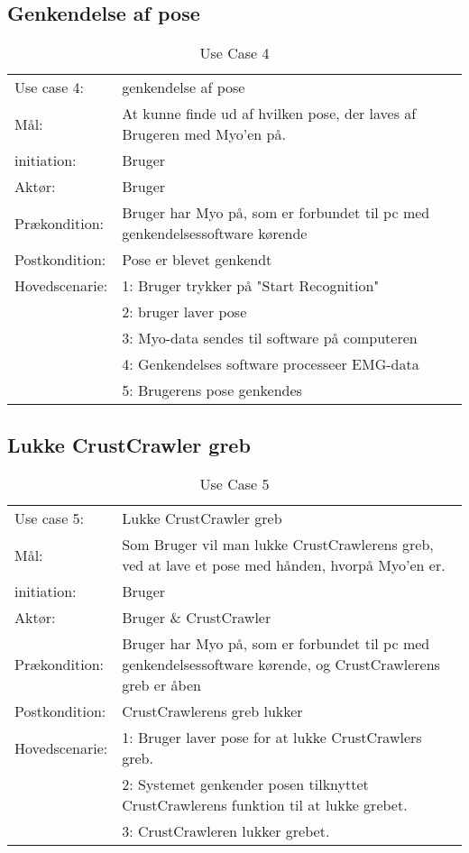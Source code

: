 \subsection{Genkendelse af pose}
\begin{center}
	\begin{table}[htbp]
		\begin{tabular}{lp{274pt}}
			\rowcolor{grey} Use case 4:		& genkendelse af pose\\
			Mål: & At kunne finde ud af hvilken pose, der laves af Brugeren med Myo'en på. \\
			initiation:	& Bruger \\
			Aktør: & Bruger\\
			Prækondition: & Bruger har Myo på, som er forbundet til pc med genkendelsessoftware kørende \\
			Postkondition: & Pose er blevet genkendt \\
			Hovedscenarie: & 1: Bruger trykker på "Start Recognition"\\
			& 2: bruger laver pose \\
			& 3: Myo-data sendes til software på computeren\\
			& 4: Genkendelses software processeer EMG-data\\
			& 5: Brugerens pose genkendes\\
		\end{tabular}
		\caption{Use Case 4}
	\end{table}
\end{center}

\subsection{Lukke CrustCrawler greb}
\begin{center}
	\begin{table}[htbp]
		\begin{tabular}{lp{274pt}}
			\rowcolor{grey} Use case 5:		& Lukke CrustCrawler greb \\
			Mål: & Som Bruger vil man lukke CrustCrawlerens greb, ved at lave et pose med hånden, hvorpå Myo'en er. \\
			initiation:	& Bruger\\
			Aktør: & Bruger \& CrustCrawler\\
			Prækondition: & Bruger har Myo på, som er forbundet til pc med genkendelsessoftware kørende, og CrustCrawlerens greb er åben \\
			Postkondition: & CrustCrawlerens greb lukker \\
			Hovedscenarie: & 1: Bruger laver pose for at lukke CrustCrawlers greb. \\
			& 2: Systemet genkender posen tilknyttet CrustCrawlerens funktion til at lukke grebet.\\
			& 3: CrustCrawleren lukker grebet.\\
		\end{tabular}
		\caption{Use Case 5}
	\end{table}
\end{center}

